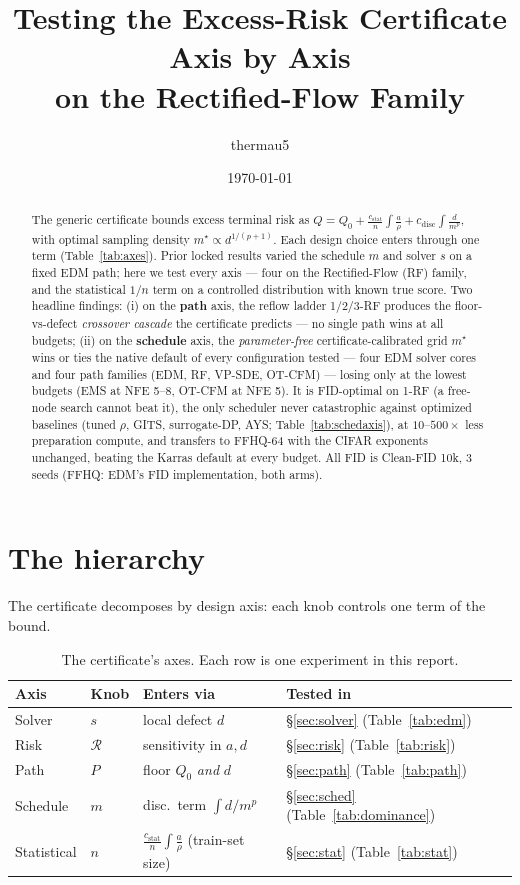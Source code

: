 \documentclass[11pt]{article}
\title{Testing the Excess-Risk Certificate Axis by Axis\\
       on the Rectified-Flow Family}
\author{thermau5}
\date{\today}
\newcommand{\R}{\mathcal R}
\begin{document}
\maketitle

\begin{abstract}
The generic certificate bounds excess terminal risk as
$Q = Q_0 + \tfrac{c_{\mathrm{stat}}}{n}\!\int\! \tfrac{a}{\rho}
      + c_{\mathrm{disc}}\!\int\! \tfrac{d}{m^{p}}$,
with optimal sampling density $m^\star\!\propto d^{1/(p+1)}$. Each design
choice enters through one term (Table~\ref{tab:axes}). Prior locked results
varied the schedule $m$ and solver $s$ on a fixed EDM path; here we test
every axis --- four on the Rectified-Flow (RF) family, and the statistical
$1/n$ term on a controlled distribution with known true score. Two headline
findings:
(i) on the \textbf{path} axis, the reflow ladder 1/2/3-RF produces the
floor-vs-defect \emph{crossover cascade} the certificate predicts --- no
single path wins at all budgets; (ii) on the \textbf{schedule} axis, the
\emph{parameter-free} certificate-calibrated grid $m^\star$ wins or ties the
native default of every configuration tested --- four EDM solver cores and
four path families (EDM, RF, VP-SDE, OT-CFM) --- losing only at the lowest
budgets (EMS at NFE 5--8, OT-CFM at NFE 5). It is FID-optimal on 1-RF (a
free-node search cannot beat it), the only scheduler never catastrophic
against optimized baselines (tuned $\rho$, GITS, surrogate-DP, AYS;
Table~\ref{tab:schedaxis}), at $10$--$500\times$ less preparation compute, and
transfers to FFHQ-64 with the CIFAR exponents unchanged, beating the Karras
default at every budget. All FID is Clean-FID 10k, 3 seeds (FFHQ: EDM's FID
implementation, both arms).
\end{abstract}

\section{The hierarchy}
\label{sec:hierarchy}
The certificate decomposes by design axis: each knob controls one term of
the bound.

\begin{table}[h]\centering
\caption{The certificate's axes. Each row is one experiment in this report.}
\label{tab:axes}
\begin{tabular}{llll}
\toprule
Axis & Knob & Enters via & Tested in \\
\midrule
Solver   & $s$ & local defect $d$            & \S\ref{sec:solver} (Table~\ref{tab:edm})\\
Risk     & $\R$& sensitivity in $a,d$        & \S\ref{sec:risk} (Table~\ref{tab:risk})\\
Path     & $P$ & floor $Q_0$ \emph{and} $d$  & \S\ref{sec:path} (Table~\ref{tab:path})\\
Schedule & $m$ & disc.\ term $\int d/m^{p}$  & \S\ref{sec:sched} (Table~\ref{tab:dominance})\\
Statistical & $n$ & $\tfrac{c_{\mathrm{stat}}}{n}\!\int\!\tfrac{a}{\rho}$ (train-set size) & \S\ref{sec:stat} (Table~\ref{tab:stat})\\
\bottomrule
\end{tabular}
\end{table}
\end{document}
